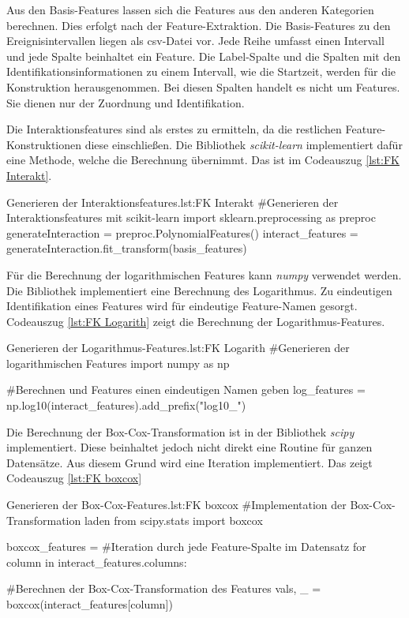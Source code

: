 Aus den Basis-Features lassen sich die Features aus den anderen Kategorien berechnen. Dies erfolgt nach der Feature-Extraktion. Die Basis-Features zu den Ereignisintervallen liegen als csv-Datei vor. Jede Reihe umfasst einen Intervall und jede Spalte beinhaltet ein Feature. Die Label-Spalte und die Spalten mit den Identifikationsinformationen zu einem Intervall, wie die Startzeit, werden für die Konstruktion herausgenommen. Bei diesen Spalten handelt es nicht um Features. Sie dienen nur der Zuordnung und Identifikation. \par

Die Interaktionsfeatures sind als erstes zu ermitteln, da die restlichen Feature-Konstruktionen diese einschließen. Die Bibliothek \textit{scikit-learn} implementiert dafür eine Methode, welche die Berechnung übernimmt. Das ist im Codeauszug \ref{lst:FK Interakt}. 

\begin{pythoncode}{Generieren der Interaktionsfeatures.}{lst:FK Interakt}
#Generieren der Interaktionsfeatures mit scikit-learn
import sklearn.preprocessing as preproc
generateInteraction = preproc.PolynomialFeatures()
interact_features = generateInteraction.fit_transform(basis_features)
\end{pythoncode}

Für die Berechnung der logarithmischen Features kann \textit{numpy} verwendet werden. Die Bibliothek implementiert eine Berechnung des Logarithmus. Zu eindeutigen Identifikation eines Features wird für eindeutige Feature-Namen gesorgt. Codeauszug \ref{lst:FK Logarith} zeigt die Berechnung der Logarithmus-Features.

\begin{pythoncode}{Generieren der Logarithmus-Features.}{lst:FK Logarith}
#Generieren der logarithmischen Features
import numpy as np

#Berechnen und Features einen eindeutigen Namen geben
log_features = np.log10(interact_features).add_prefix("log10_") 
\end{pythoncode}

Die Berechnung der Box-Cox-Transformation ist in der Bibliothek \textit{scipy} implementiert. Diese beinhaltet jedoch nicht direkt eine Routine für ganzen Datensätze. Aus diesem Grund wird eine Iteration implementiert. Das zeigt Codeauszug \ref{lst:FK boxcox}

\begin{pythoncode}{Generieren der Box-Cox-Features.}{lst:FK boxcox}
#Implementation der Box-Cox-Transformation laden
from scipy.stats import boxcox

boxcox_features = {}
#Iteration durch jede Feature-Spalte im Datensatz
for column in interact_features.columns:   
        
        #Berechnen der Box-Cox-Transformation des Features
        vals, _ = boxcox(interact_features[column])
\end{pythoncode}

